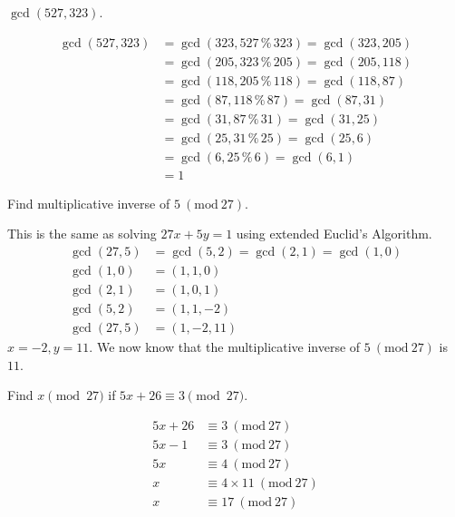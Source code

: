 \documentclass[11pt]{article}
\newcommand{\Mod}[1]{\ (\mathrm{mod}\ #1)}
\renewcommand*{\bmod}{\mathbin{\%}}
\begin{document}
\newpage
{}

\begin{Parts}
    \Part $\gcd(527,323)$.
    \begin{Answer}
        \begin{align*}
            \gcd(527,323) &= \gcd(323,527\bmod 323) = \gcd(323,205) \\
                          &= \gcd(205,323\bmod 205) = \gcd(205,118) \\
                          &= \gcd(118,205\bmod 118) = \gcd(118,87) \\
                          &= \gcd(87,118\bmod 87) = \gcd(87,31) \\
                          &= \gcd(31,87\bmod 31) = \gcd(31,25) \\
                          &= \gcd(25,31\bmod 25) = \gcd(25,6) \\
                          &= \gcd(6,25\bmod 6) = \gcd(6,1) \\
                          &= 1
        \end{align*}
    \end{Answer}

    \Part Find multiplicative inverse of $5\Mod{27}$. 
    \begin{Answer}
        This is the same as solving $27x+5y=1$ using extended Euclid's Algorithm. 
        \begin{align*}
            \gcd(27,5) &= \gcd(5,2) = \gcd(2,1) = \gcd(1,0) \\
            \gcd(1,0)  &= (1, 1, 0) \\
            \gcd(2,1)  &= (1, 0, 1) \\
            \gcd(5,2)  &= (1, 1, -2) \\
            \gcd(27,5) &= (1, -2, 11)
        \end{align*}
        $x=-2,y=11$. We now know that the multiplicative inverse of $5\Mod{27}$ is $11$. 
    \end{Answer}

    \Part Find $x \pmod{27}$ if $5x + 26 \equiv 3 \pmod{27}$. 
    \begin{Answer}
        \begin{align*}
            5x + 26 &\equiv 3 \Mod{27} \\
            5x - 1  &\equiv 3 \Mod{27} \\
            5x      &\equiv 4 \Mod{27} \\
            x       &\equiv 4\times 11 \Mod{27} \\
            x       &\equiv 17 \Mod{27}
        \end{align*}
    \end{Answer}


\end{Parts}
\end{document}
